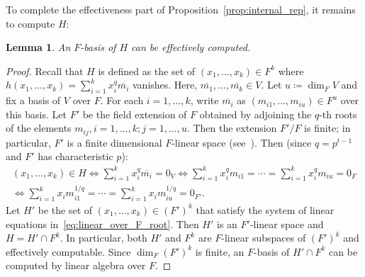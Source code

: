 \documentclass[letterpaper, 11pt, thm-restate]{article}
\numberwithin{equation}{section}
\newtheorem{lemma}[theorem]{Lemma}
\theoremstyle{definition}
\theoremstyle{definition}
\theoremstyle{definition}
\begin{document}
To complete the effectiveness part of Proposition~\ref{prop:internal_rep}, it remains to compute $H$:
\begin{lemma}\label{lem:effective_H}
    An $F$-basis of $H$ can be effectively computed.
\end{lemma}
\begin{proof}
    Recall that $H$ is defined as the set of $(x_1, \ldots, x_k) \in F^k$ where $h(x_1, \ldots ,x_k)=\sum_{i = 1}^k x_i^q\overline{m_i}$ vanishes.
    Here, $\overline{m_1}, \ldots, \overline{m_k} \in V$.
    Let $u \coloneqq \dim_F V$ and fix a basis of $V$ over $F$. For each $i = 1, \ldots, k$, write $\overline{m_i}$ as $(m_{i1}, \ldots, m_{iu}) \in F^u$ over this basis.
    Let $F'$ be the field extension of $F$ obtained by adjoining the $q$-th roots of the elements $m_{ij}, i = 1, \ldots, k; j =1, \ldots, u$.
    Then the extension $F'/F$ is finite; in particular, $F'$ is a finite dimensional $F$-linear space (see~\cite[Chapter~3.5]{roman2006field}).
    Then (since $q = p^{t-1}$ and $F'$ has characteristic $p$):
    \begin{multline}\label{eq:linear_over_F_root}
        (x_1, \ldots, x_k) \in H \iff \sum_{i = 1}^k x_i^q\overline{m_i} = 0_V \iff \sum_{i = 1}^k x_i^q m_{i1} = \cdots = \sum_{i = 1}^k x_i^q m_{iu} = 0_F \\
        \iff \sum_{i = 1}^k x_i m_{i1}^{1/q} = \cdots = \sum_{i = 1}^k x_i m_{iu}^{1/q} = 0_{F'}.
    \end{multline}
    Let $H'$ be the set of $(x_1, \ldots, x_k) \in \left(F'\right)^k$ that satisfy the system of linear equations in~\eqref{eq:linear_over_F_root}.
    Then $H'$ is an $F'$-linear space and $H = H' \cap F^k$.
    In particular, both $H'$ and $F^k$ are $F$-linear subspaces of $\left(F'\right)^k$ and effectively computable.
    Since $\dim_F \left(F'\right)^k$ is finite, an $F$-basis of $H' \cap F^k$ can be computed by linear algebra over $F$.
\end{proof}
\end{document}
